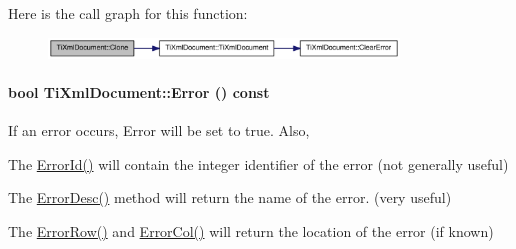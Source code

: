 Here is the call graph for this function:\nopagebreak
\begin{figure}[H]
\begin{center}
\leavevmode
\includegraphics[width=264pt]{class_ti_xml_document_ac9e8f09b23454d953b32d1b65cd1409e_cgraph}
\end{center}
\end{figure}
\hypertarget{class_ti_xml_document_a6dfc01a6e5d58e56acd537dfd3bdeb29}{
\paragraph[{Error}]{\setlength{\rightskip}{0pt plus 5cm}bool TiXmlDocument::Error () const}\hfill}
\label{class_ti_xml_document_a6dfc01a6e5d58e56acd537dfd3bdeb29}
If an error occurs, Error will be set to true. Also,
\begin{DoxyItemize}
\item The \hyperlink{class_ti_xml_document_af96fc2f3f9ec6422782bfe916c9e778f}{ErrorId()} will contain the integer identifier of the error (not generally useful)
\item The \hyperlink{class_ti_xml_document_a9d0f689f6e09ea494ea547be8d79c25e}{ErrorDesc()} method will return the name of the error. (very useful)
\item The \hyperlink{class_ti_xml_document_af30efc75e804aa2e92fb8be3a8cb676e}{ErrorRow()} and \hyperlink{class_ti_xml_document_aa90bc630ee5203c6109ca5fad3323649}{ErrorCol()} will return the location of the error (if known) 
\end{DoxyItemize}

